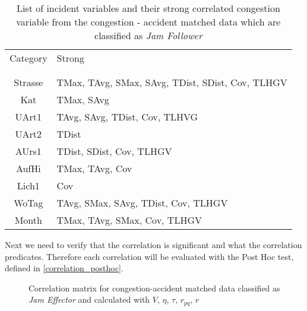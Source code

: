 \begin{table}[h!]
	\centering
	\begin{tabular}{c|l}  
		Category & Strong \\
		\\[-1em]
		\hline
		\\[-1em]
		Strasse & TMax, TAvg, SMax, SAvg, TDist, SDist, Cov, TLHGV \\ 
 		Kat & TMax, SAvg \\ %
 		UArt1 & TAvg, SAvg, TDist, Cov, TLHVG \\ %
 		UArt2 & TDist \\ %
 		AUrs1 & TDist, SDist, Cov, TLHGV \\ %
 		AufHi & TMax, TAvg, Cov \\ %
 		Lich1 & Cov \\ %
 		WoTag & TAvg, SMax, SAvg, TDist, Cov, TLHGV \\ %
 		Month & TMax, TAvg, SMax, Cov, TLHGV \\ %
	\end{tabular}
    \caption{List of incident variables and their strong correlated congestion variable from the congestion - accident matched data which are classified as \textit{Jam Follower}}
	\label{tbl:correlation_list_baysis_follower}
\end{table}
Next we need to verify that the correlation is significant and what the correlation predicates. Therefore each correlation will be evaluated with the Post Hoc test, defined in \cref{correlation_posthoc}. 
\begin{figure}[!ht]
	\centering
	\caption{Correlation matrix for congestion-accident matched data classified as \textit{Jam Effector} and calculated with $V$, $\eta$, $\tau$, $r_{pq}$, $r$}
	\label{img:correlation_matrix_selected_effector_cramers}
\end{figure}

